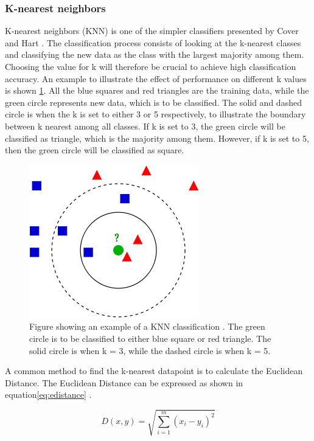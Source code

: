 \documentclass[USenglish]{ifimaster}  %
\begin{document}
\subsubsection{K-nearest neighbors}
K-nearest neighbors (KNN) is one of the simpler classifiers presented by Cover and Hart \cite{1053964}. The classification process consists of looking at the k-nearest classes and classifying the new data as the class with the largest majority among them. Choosing the value for k will therefore be crucial to achieve high classification accuracy. An example to illustrate the effect of performance on different k values is shown \ref{fig:KNN}. All the blue squares and red triangles are the training data, while the green circle represents new data, which is to be classified. The solid and dashed circle is when the k is set to either 3 or 5 respectively, to illustrate the boundary between k nearest among all classes. If k is set to 3, the green circle will be classified as triangle, which is the majority among them. However, if k is set to 5, then the green circle will be classified as square.



\begin{figure}[h]
		\centering
		\includegraphics[scale=0.5]{Figures/KNN.png}
		\caption{Figure showing an example of a KNN classification \cite{KnnClassification}. The green circle is to be classified to either blue square or red triangle. The solid circle is when k = 3, while the dashed circle is when k = 5.}
		\label{fig:KNN}
\end{figure}
	
A common method to find the k-nearest datapoint is to calculate the Euclidean Distance. The Euclidean Distance can be expressed as shown in equation\ref{eq:edistance} \cite{Bao2004}.
	
\begin{equation}
	D(x,y)=\sqrt{\sum_{i=1}^{m}(x_{i}-y_{i})^2}
	\label{eq:edistance}
\end{equation}
\end{document}
